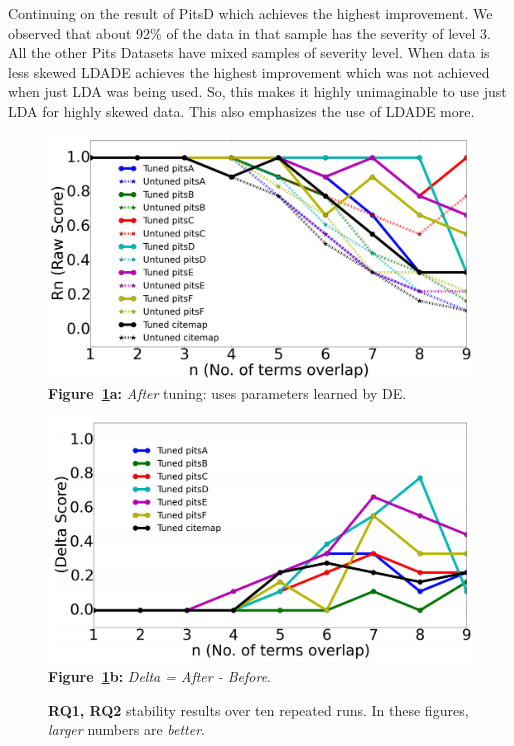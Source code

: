 \documentclass[twocolumn,5p,sort&compress]{elsarticle}
\theoremstyle{break}
\begin{document}
  Continuing on the result of PitsD which achieves the highest improvement. We observed that  about 92\% of the data in that sample has the severity of level 3.  All the other Pits Datasets have mixed samples of severity level. When data is less skewed LDADE achieves the highest improvement which was not achieved when just LDA was being used. So, this makes it highly unimaginable to use just LDA for highly skewed data. This also emphasizes the use of LDADE more. 
  \begin{figure}[!t]
        \begin{center}
        \includegraphics[width=0.9\linewidth]{./fig/raw_graph.png}
  \footnotesize{{\bf Figure~\ref{fig:delta}a:}  {\em After} tuning: uses parameters learned by DE.}

        \includegraphics[width=0.9\linewidth]{./fig/tuned_delta_vem.png}
  \footnotesize{{\bf Figure~\ref{fig:delta}b:}  {\em Delta = After - Before}.}
  \end{center}
    \caption{{\bf RQ1, RQ2} stability results over ten repeated runs. In these figures, {\em larger} numbers
    are {\em better}.}\label{fig:delta}
\end{figure}
\end{document}
